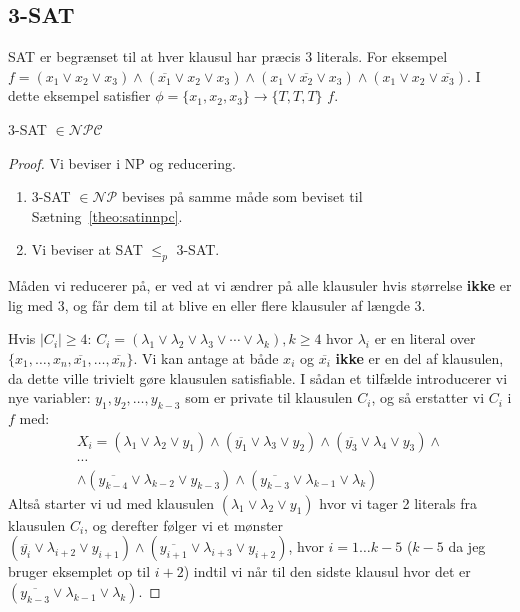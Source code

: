 \subsection{3-SAT}%
\label{subsec:3sat}

SAT er begrænset til at hver klausul har præcis $3$ literals. For eksempel $f = (x_{1} \vee x_{2} \vee x_{3}) \wedge (\overline{x_{1}} \vee x_{2} \vee x_{3}) \wedge (x_{1} \vee \overline{x_{2}} \vee x_{3}) \wedge (x_{1} \vee x_{2} \vee \overline{x_{3}})$. I dette eksempel satisfier \(\phi = \{x_{1}, x_{2}, x_{3}\} \rightarrow \{T, T, T\}\) $f$.

\begin{theorem}
	3-SAT \(\in \mathcal{NPC}\)
\end{theorem}

\begin{proof}
	Vi beviser i NP og reducering.
	\begin{enumerate}
		\item 3-SAT \(\in \mathcal{NP}\) bevises på samme måde som beviset til Sætning~\ref{theo:satinnpc}.
		\item Vi beviser at SAT $\le_{p}$ 3-SAT.
	\end{enumerate}
	Måden vi reducerer på, er ved at vi ændrer på alle klausuler hvis størrelse \textbf{ikke} er lig med 3, og får dem til at blive en eller flere klausuler af længde 3.

	Hvis $|C_{i}| \ge 4$: $C_{i} = (\lambda_{1} \vee \lambda_{2} \vee \lambda_{3} \vee \cdots \vee \lambda_{k}), k \ge 4$ hvor $\lambda_{i}$ er en literal over $\{x_{1}, \ldots, x_{n}, \overline{x_{1}}, \ldots, \overline{x_{n}}\}$. Vi kan antage at både $x_{i}$ og $\overline{x_{i}}$ \textbf{ikke} er en del af klausulen, da dette ville trivielt gøre klausulen satisfiable. I sådan et tilfælde introducerer vi nye variabler: $y_{1}, y_{2}, \ldots, y_{k-3}$ som er private til klausulen $C_{i}$, og så erstatter vi $C_{i}$ i $f$ med:
	\begin{align*}
		X_{i} = (\lambda_{1} \vee \lambda_{2} \vee y_{1}) \wedge (\overline{y_{1}} \vee \lambda _{3} \vee y_{2}) \wedge (\overline{y_{3}} \vee \lambda_{4} \vee y_{3})
		\wedge \\
		\cdots \\
		\wedge
		(\overline{y_{k-4}} \vee \lambda_{k-2} \vee y_{k-3}) \wedge (\overline{y_{k-3}} \vee \lambda_{k-1} \vee \lambda_{k})
	\end{align*}
	Altså starter vi ud med klausulen $(\lambda_{1} \vee \lambda_{2} \vee y_{1})$ hvor vi tager 2 literals fra klausulen $C_{i}$, og derefter følger vi et mønster $(\overline{y_{i}} \vee \lambda_{i+2} \vee y_{i+1}) \wedge (\overline{y_{i+1}} \vee \lambda_{i+3} \vee y_{i+2})$, hvor $i = 1 \ldots k-5$ ($k-5$ da jeg bruger eksemplet op til $i+2$) indtil vi når til den sidste klausul hvor det er $(\overline{y_{k-3}} \vee \lambda_{k-1} \vee \lambda_{k})$.


\end{proof}
